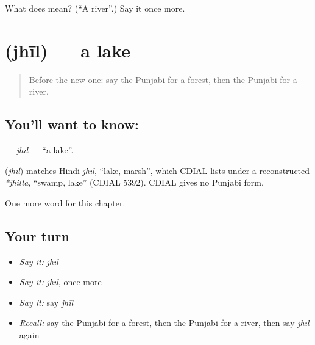 \begin{tcolorbox}[breakable,colback=teal!4,colframe=teal!35!black,title={Before you move on}]
What does  mean? (\textquotedblleft{}A river\textquotedblright{}.) Say it once more.
\end{tcolorbox}
\section[\texorpdfstring{\pa{ਝੀਲ} (jhīl)}{ਝੀਲ (jhīl)}]{ (jhīl) — a lake}

\label{lesson:PA-C74-jhil}



\begin{quote}
Before the new one: say the Punjabi for a forest, then the Punjabi for a river.
\end{quote}

\subsection*{You'll want to know: }
\textbf{} — \emph{jhīl} — \textquotedblleft{}a lake\textquotedblright{}.

\begin{cousinweb}
\textbf{} (\emph{jhīl}) matches Hindi \emph{jhīl}, \textquotedblleft{}lake, marsh\textquotedblright{}, which CDIAL lists under a reconstructed \emph{*jhilla}, \textquotedblleft{}swamp, lake\textquotedblright{} (CDIAL 5392). CDIAL gives no Punjabi form.
\end{cousinweb}

\begin{grammarlens}[title={What you've built}]
One more word for this chapter.
\end{grammarlens}

\subsection*{Your turn}
\begin{itemize}
\raggedright
  \item \emph{Say it:} \emph{jhīl}
  \item \emph{Say it:} \emph{jhīl}, once more
  \item \emph{Say it:} say \emph{jhīl}
  \item \emph{Recall:} say the Punjabi for a forest, then the Punjabi for a river, then say \emph{jhīl} again
\end{itemize}

